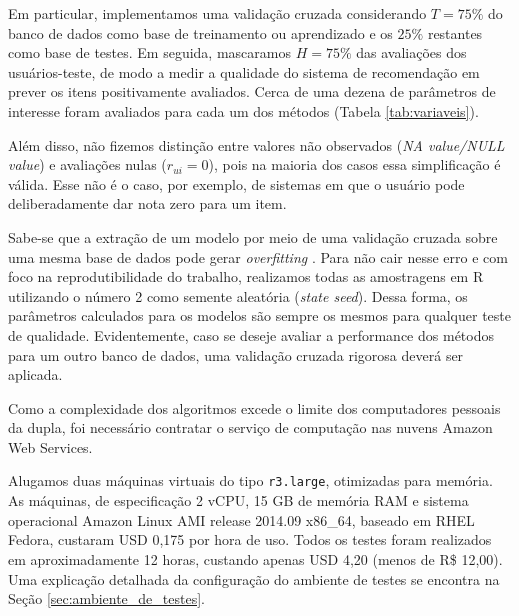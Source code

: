 Em particular, implementamos uma validação cruzada considerando $T=75\%$ do banco de dados como base de treinamento ou aprendizado e os $25\%$ restantes como base de testes. Em seguida, mascaramos $H=75\%$ das avaliações dos usuários-teste, de modo a medir a qualidade do sistema de recomendação em prever os itens positivamente avaliados. Cerca de uma dezena de parâmetros de interesse foram avaliados para cada um dos métodos (Tabela \ref{tab:variaveis}). 

Além disso, não fizemos distinção entre valores não observados (\textit{NA value/NULL value}) e avaliações nulas ($r_{ui}=0$), pois na maioria dos casos essa simplificação é válida. Esse não é o caso, por exemplo, de sistemas em que o usuário pode deliberadamente dar  nota zero para um item.

Sabe-se que a extração de um modelo por meio de uma validação cruzada sobre uma mesma base de dados pode gerar \textit{overfitting} \cite{ng1997preventing}. Para não cair nesse erro e com foco na reprodutibilidade do trabalho, realizamos todas as amostragens em R utilizando o número 2 como semente aleatória (\textit{state seed}). Dessa forma, os parâmetros calculados para os modelos são sempre os mesmos para qualquer teste de qualidade. Evidentemente, caso se deseje avaliar a performance dos métodos para um outro banco de dados, uma validação cruzada rigorosa deverá ser aplicada. 



Como a complexidade dos algoritmos excede o limite dos computadores pessoais da dupla, foi necessário contratar o serviço de computação nas nuvens Amazon Web Services.

Alugamos duas máquinas virtuais do tipo \texttt{r3.large}, otimizadas para memória. As máquinas, de especificação 2 vCPU, 15 GB de memória RAM e sistema operacional Amazon Linux AMI release 2014.09 x86\_64, baseado em RHEL Fedora, custaram USD 0,175 por hora de uso. Todos os testes foram realizados em aproximadamente 12 horas, custando apenas USD 4,20 (menos de R\$ 12,00). Uma explicação detalhada da configuração do ambiente de testes se encontra na Seção \ref{sec:ambiente_de_testes}.